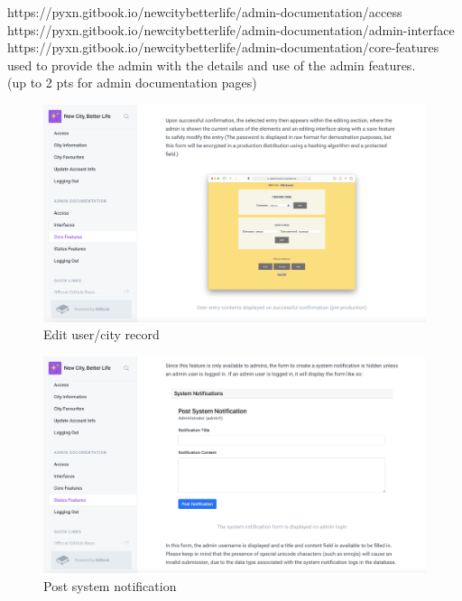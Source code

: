 \documentclass[12pt, letterpaper]{article}
\begin{document}
 \newpage

https://pyxn.gitbook.io/newcitybetterlife/admin-documentation/access
\\https://pyxn.gitbook.io/newcitybetterlife/admin-documentation/admin-interface
\\https://pyxn.gitbook.io/newcitybetterlife/admin-documentation/core-features
\\used to provide the admin with the details and use of the admin features.
\\(up to 2 pts for admin documentation pages)

\begin{figure}[htbp]
	\centering
	\includegraphics[width=5in]{images/q18-1.png}
	\caption{Edit user/city record}
 \end{figure}
 
 \begin{figure}[htbp]
	\centering
	\includegraphics[width=5in]{images/q18-2.png}
	\caption{Post system notification}
 \end{figure}
\end{document}
